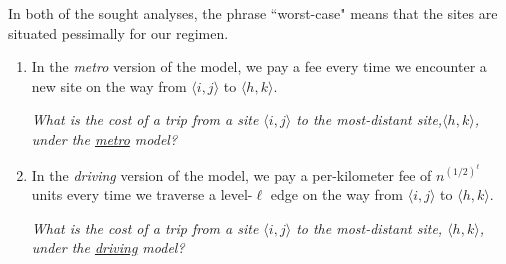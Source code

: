 \begin{itemize}
In both of the sought analyses, the phrase ``worst-case" means that the sites are situated pessimally for our regimen.
  \begin{enumerate}
  \item
In the {\em metro} version of the model, we pay a fee every time we encounter a new site on the way from $\langle i,j \rangle$ to $\langle h,k \rangle$.

\smallskip

{\em What is the cost of a trip from a site $\langle i,j \rangle$ to the most-distant site,$\langle h,k \rangle$, under the \underline{metro} model?}

  \medskip\item
In the {\em driving} version of the model, we pay a per-kilometer fee of $n^{(1/2)^\ell}$ units every time we traverse a level-$\ell$ edge on the way from $\langle i,j \rangle$ to $\langle h,k \rangle$.
 
 \smallskip

{\em What is the cost of a trip from a site $\langle i,j \rangle$ to the most-distant site, $\langle h,k \rangle$, under the \underline{driving} model?}


\end{enumerate}
\end{itemize}
